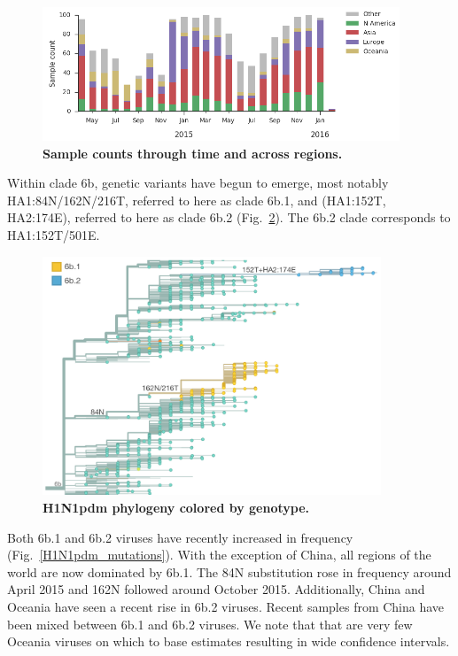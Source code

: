 \documentclass[11pt,oneside,letterpaper]{article}
\begin{document}
\begin{figure}[h!]
	\centering		
	\includegraphics[width=0.95\textwidth]{../figures/feb-2016/H1N1pdm_counts.png}
	\caption{\textbf{Sample counts through time and across regions.} 
	}
	\label{H1N1pdm_counts}
\end{figure}

Within clade 6b, genetic variants have begun to emerge, most notably HA1:84N/162N/216T, referred to here as clade 6b.1, and (HA1:152T, HA2:174E), referred to here as clade 6b.2 (Fig.\ \ref{H1N1pdm_tree}). The 6b.2 clade corresponds to HA1:152T/501E.

\begin{figure}[h!]
	\centering		
	\includegraphics[width=0.9\textwidth]{../figures/feb-2016/H1N1pdm_tree.png}
	\caption{\textbf{H1N1pdm phylogeny colored by genotype.} 
	}
	\label{H1N1pdm_tree}
\end{figure}

\pagebreak

Both 6b.1 and 6b.2 viruses have recently increased in frequency (Fig.\ \ref{H1N1pdm_mutations}). With the exception of China, all regions of the world are now dominated by 6b.1. The 84N substitution rose in frequency around April 2015 and 162N followed around October 2015. Additionally, China and Oceania have seen a recent rise in 6b.2 viruses. Recent samples from China have been mixed between 6b.1 and 6b.2 viruses. We note that that are very few Oceania viruses on which to base estimates resulting in wide confidence intervals.
\end{document}
